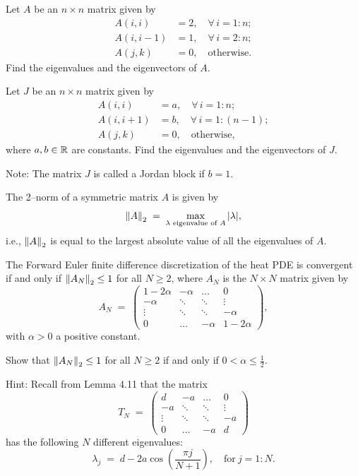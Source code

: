 \begin{exercises}
\item Let $A$ be an $n \times n$ matrix given by
\begin{align*}
A(i,i) &= 2, \quad \forall\, i = 1:n;\\
A(i,i-1) &= 1, \quad \forall\, i = 2:n;\\
A(j,k) &= 0, \quad \text{otherwise}.
\end{align*}
Find the eigenvalues and the eigenvectors of $A$.

\item Let $J$ be an $n \times n$ matrix given by
\begin{align*}
A(i,i) &= a, \quad \forall\, i = 1:n;\\
A(i,i+1) &= b, \quad \forall\, i = 1:(n-1);\\
A(j,k) &= 0, \quad \text{otherwise},
\end{align*}
where $a, b \in \mathbb{R}$ are constants. Find the eigenvalues and the eigenvectors
of $J$.

\noindent Note: The matrix $J$ is called a Jordan block if $b = 1$.

\item The 2--norm of a symmetric matrix $A$ is given by
\begin{equation}
\left\|A\right\|_2 \;=\; \max_{\lambda \text{ eigenvalue of } A} |\lambda|,
\end{equation}
i.e., $\left\|A\right\|_2$ is equal to the largest absolute value of all the
eigenvalues of $A$.

The Forward Euler finite difference discretization of the heat PDE is
convergent if and only if $\left\|A_N\right\|_2 \leq 1$ for all $N \geq 2$, where
$A_N$ is the $N \times N$ matrix given by
\[
A_N \;=\; \begin{pmatrix} 1-2\alpha & -\alpha & \dots & 0\\ -\alpha & \ddots & \ddots & \vdots\\ \vdots & \ddots & \ddots & -\alpha\\ 0 & \dots & -\alpha & 1-2\alpha \end{pmatrix},
\]
with $\alpha > 0$ a positive constant.

Show that $\left\|A_N\right\|_2 \leq 1$ for all $N \geq 2$ if and only if $0 < \alpha
\leq \frac{1}{2}$.

\noindent Hint: Recall from Lemma 4.11 that the matrix
\[
T_N \;=\; \begin{pmatrix} d & -a & \dots & 0\\ -a & \ddots & \ddots & \vdots\\ \vdots & \ddots & \ddots & -a\\ 0 & \dots & -a & d \end{pmatrix}
\]
has the following $N$ different eigenvalues:
\[
\lambda_j \;=\; d - 2a\cos\left(\frac{\pi j}{N+1}\right), \quad \text{for} \ j = 1:N.
\]


\end{exercises}
